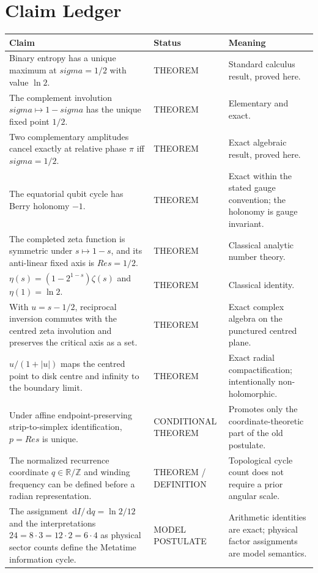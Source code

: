 \documentclass[11pt,oneside]{book}
\theoremstyle{remark}
\newcommand{\Ree}{\operatorname{Re}}
\newcommand{\dd}{\,\mathrm{d}}
\newcommand{\status}[1]{\textsf{#1}}
\def\Ree{Re}%
\def\sigma{sigma}%
\begin{document}
\chapter*{Claim Ledger}
\begin{longtable}{@{}p{}p{}p{}@{}}
\toprule
Claim & Status & Meaning\\
\midrule
Binary entropy has a unique maximum at $\sigma=1/2$ with value $\ln2$. & \status{THEOREM} & Standard calculus result, proved here.\\
The complement involution $\sigma\mapsto1-\sigma$ has the unique fixed point $1/2$. & \status{THEOREM} & Elementary and exact.\\
Two complementary amplitudes cancel exactly at relative phase $\pi$ iff $\sigma=1/2$. & \status{THEOREM} & Exact algebraic result, proved here.\\
The equatorial qubit cycle has Berry holonomy $-1$. & \status{THEOREM} & Exact within the stated gauge convention; the holonomy is gauge invariant.\\
The completed zeta function is symmetric under $s\mapsto1-s$, and its anti-linear fixed axis is $\Ree s=1/2$. & \status{THEOREM} & Classical analytic number theory.\\
$\eta(s)=(1-2^{1-s})\zeta(s)$ and $\eta(1)=\ln2$. & \status{THEOREM} & Classical identity.\\
With $u=s-1/2$, reciprocal inversion commutes with the centred zeta involution and preserves the critical axis as a set. & \status{THEOREM} & Exact complex algebra on the punctured centred plane.\\
$u/(1+|u|)$ maps the centred point to disk centre and infinity to the boundary limit. & \status{THEOREM} & Exact radial compactification; intentionally non-holomorphic.\\
Under affine endpoint-preserving strip-to-simplex identification, $p=\Ree s$ is unique. & \status{CONDITIONAL THEOREM} & Promotes only the coordinate-theoretic part of the old postulate.\\
The normalized recurrence coordinate $q\in\mathbb R/\mathbb Z$ and winding frequency can be defined before a radian representation. & \status{THEOREM / DEFINITION} & Topological cycle count does not require a prior angular scale.\\
The assignment $\dd I/\dd q=\ln2/12$ and the interpretations $24=8\cdot3=12\cdot2=6\cdot4$ as physical sector counts define the Metatime information cycle. & \status{MODEL POSTULATE} & Arithmetic identities are exact; physical factor assignments are model semantics.\\

\end{longtable}
\end{document}
